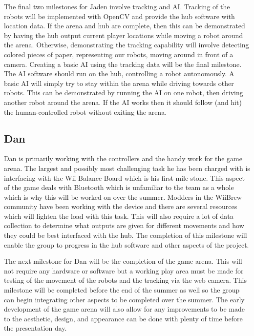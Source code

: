 \documentclass[11pt]{ieeeconf}
\begin{document}
The final two milestones for Jaden involve tracking and AI. Tracking of the robots will be implemented with OpenCV and provide the hub software with location data. If the arena and hub are complete, then this can be demonstrated by having the hub output current player locations while moving a robot around the arena. Otherwise, demonstrating the tracking capability will involve detecting colored pieces of paper, representing our robots, moving around in front of a camera. Creating a basic AI using the tracking data will be the final milestone. The AI software should run on the hub, controlling a robot autonomously. A basic AI will simply try to stay within the arena while driving towards other robots. This can be demonstrated by running the AI on one robot, then driving another robot around the arena. If the AI works then it should follow (and hit) the human-controlled robot without exiting the arena.


\subsection{Dan}

Dan is primarily working with the controllers and the handy work for the game arena. The largest and possibly most challenging task he has been charged with is interfacing with the Wii Balance Board which is his first mile stone. This aspect of the game deals with Bluetooth which is unfamiliar to the team as a whole which is why this will be worked on over the summer. Modders in the WiiBrew \cite{homebrew} community have been working with the device and there are several resources which will lighten the load with this task. This will also require a lot of data collection to determine what outputs are given for different movements and how they could be best interfaced with the hub. The completion of this milestone will enable the group to progress in the hub software and other aspects of the project.

The next milestone for Dan will be the completion of the game arena. This will not require any hardware or software but a working play area must be made for testing of the movement of the robots and the tracking via the web camera. This milestone will be completed before the end of the summer as well so the group can begin integrating other aspects to be completed over the summer. The early development of the game arena will also allow for any improvements to be made to the aesthetic, design, and appearance can be done with plenty of time before the presentation day.
\end{document}
